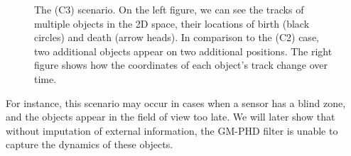 \begin{figure}
\begin{subfigure}[]{0.48\linewidth}
\begin{subfigure}[b]{\linewidth}
        \end{subfigure}
    \end{subfigure}
  \caption[True tracks of objects in the (C3) and (C4) scenarios.]{The (C3) scenario. On the left figure, we can see the tracks of multiple objects in the 2D space, their locations of birth (black circles) and death (arrow heads). In comparison to the (C2) case, two additional objects appear on two additional positions. The right figure shows how the coordinates of each object's track change over time.}
  \label{fig:c3-scenario}
\end{figure}

For instance, this scenario may occur in cases when a sensor has a blind zone, and the objects appear in the field of view too late. We will later show that without imputation of external information, the GM-PHD filter is unable to capture the dynamics of these objects.
